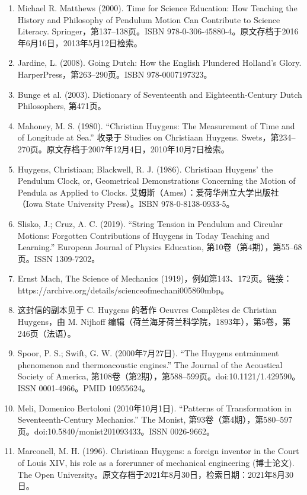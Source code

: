 \begin{enumerate}
\item Michael R. Matthews (2000). Time for Science Education: How Teaching the History and Philosophy of Pendulum Motion Can Contribute to Science Literacy. Springer，第137–138页。ISBN 978-0-306-45880-4。原文存档于2016年6月16日，2013年5月12日检索。
\item Jardine, L. (2008). Going Dutch: How the English Plundered Holland's Glory. HarperPress，第263–290页。ISBN 978-0007197323。
\item Bunge et al. (2003). Dictionary of Seventeenth and Eighteenth-Century Dutch Philosophers, 第471页。
\item Mahoney, M. S. (1980). “Christian Huygens: The Measurement of Time and of Longitude at Sea.” 收录于 Studies on Christiaan Huygens. Swets，第234–270页。原文存档于2007年12月4日，2010年10月7日检索。
\item Huygens, Christiaan; Blackwell, R. J. (1986). Christiaan Huygens' the Pendulum Clock, or, Geometrical Demonstrations Concerning the Motion of Pendula as Applied to Clocks. 艾姆斯（Ames）：爱荷华州立大学出版社（Iowa State University Press）。ISBN 978-0-8138-0933-5。
\item Slisko, J.; Cruz, A. C. (2019). “String Tension in Pendulum and Circular Motions: Forgotten Contributions of Huygens in Today Teaching and Learning.” European Journal of Physics Education, 第10卷（第4期），第55–68页。ISSN 1309-7202。
\item Ernst Mach, The Science of Mechanics (1919)，例如第143、172页。链接：https://archive.org/details/scienceofmechani005860mbp。
\item 这封信的副本见于 C. Huygens 的著作 Oeuvres Complètes de Christian Huygens，由 M. Nijhoff 编辑（荷兰海牙荷兰科学院，1893年），第5卷，第246页（法语）。
\item Spoor, P. S.; Swift, G. W. (2000年7月27日). “The Huygens entrainment phenomenon and thermoacoustic engines.” The Journal of the Acoustical Society of America, 第108卷（第2期），第588–599页。doi:10.1121/1.429590。ISSN 0001-4966。PMID 10955624。
\item Meli, Domenico Bertoloni (2010年10月1日). “Patterns of Transformation in Seventeenth-Century Mechanics.” The Monist, 第93卷（第4期），第580–597页。doi:10.5840/monist201093433。ISSN 0026-9662。
\item Marconell, M. H. (1996). Christiaan Huygens: a foreign inventor in the Court of Louis XIV, his role as a forerunner of mechanical engineering (博士论文). The Open University。原文存档于2021年8月30日，检索日期：2021年8月30日。

\end{enumerate}

